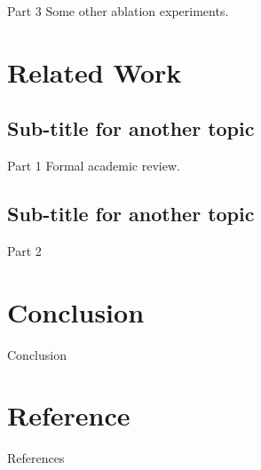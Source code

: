 \documentclass[handout,t,aspectratio=1610]{beamer}
\begin{document}
\begin{frame}{Part 3}
    Some other ablation experiments.
\end{frame}




\section{Related Work}
\subsection{Sub-title for another topic}
\begin{frame}{Part 1}
Formal academic review.

\end{frame}



\subsection{Sub-title for another topic}
\begin{frame}{Part 2}


\end{frame}


\section{Conclusion}
\begin{frame}{Conclusion}


\end{frame}

\section{Reference}
\begin{frame}[allowframebreaks]{References}




\end{frame}
\end{document}
